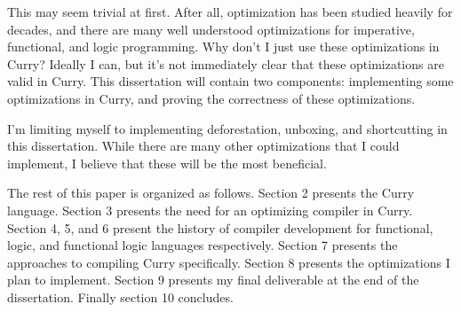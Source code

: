 This may seem trivial at first.  After all, optimization has been studied heavily for decades, and there are many well understood
optimizations for imperative, functional, and logic programming. 
\cite{optminzation_allen, dataflow_allen, LowryMedlock69, dataflow_kildall,
AhoUllman77, continuations_appel, compilers_appel, orbit, ssa_alpern, ssa_Wegman, ssa_wolfe,
steele78, stg-peytonJones, anormal_Flanagan, lambda_rename_steel, lambda_goto,
deforestation_wadler, shortcut_deforestation, haskell_inliner}
Why don't I just use these optimizations in Curry?
Ideally I can, but it's not immediately clear that these optimizations are valid in Curry.
This dissertation will contain two components: implementing some optimizations in Curry,
and proving the correctness of these optimizations.

I'm limiting myself to implementing deforestation, unboxing, and shortcutting in this dissertation.
While there are many other optimizations that I could implement, I believe that these will be the most beneficial.

The rest of this paper is organized as follows.
Section 2 presents the Curry language. Section 3 presents the need for an optimizing compiler in Curry.
Section 4, 5, and 6 present the history of compiler development for functional, logic, and functional logic languages respectively.
Section 7 presents the approaches to compiling Curry specifically.
Section 8 presents the optimizations I plan to implement.
Section 9 presents my final deliverable at the end of the dissertation.
Finally section 10 concludes.
